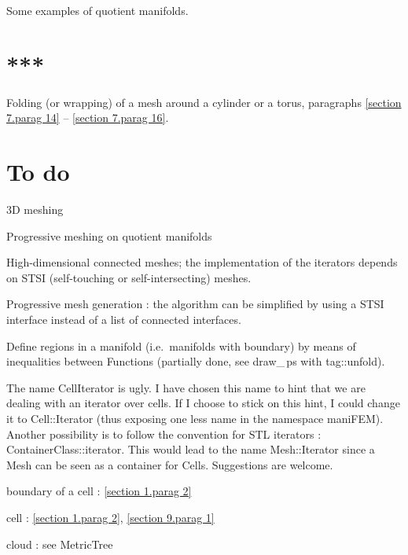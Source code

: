 \documentclass[a4paper]{scrreprt}
\def\numb{}
\newcommand\verm[1]{\textcolor{manif}{#1}}
\renewcommand\tt{\normalfont\ttfamily}
\begin{document}
\noindent Some examples of quotient manifolds.


\section*{***}

\noindent Folding (or wrapping) of a mesh around a cylinder or a torus, paragraphs
\ref{\numb section 7.\numb parag 14} -- \ref{\numb section 7.\numb parag 16}.


\section*{To do}

\noindent 3D meshing

\noindent Progressive meshing on quotient manifolds

\noindent High-dimensional connected meshes; the implementation of the iterators depends
on STSI (self-touching or self-intersecting) meshes.

\noindent Progressive mesh generation : the algorithm can be simplified by using
a STSI interface instead of a list of connected interfaces.

\noindent Define regions in a manifold (i.e.\ manifolds with boundary) by means of
inequalities between {\small\tt\verm{Function}}s (partially done, see {\small\tt draw\_\,ps}
with {\small\tt\verm{tag}::unfold}).

\noindent The name {\small\tt\verm{CellIterator}} is ugly.
I have chosen this name to hint that we are dealing with an iterator over cells.
If I choose to stick on this hint, I could change it to {\small\tt\verm{Cell}::Iterator}
(thus exposing one less name in the {\small\tt namespace \verm{maniFEM}}).
Another possibility is to follow the convention for {\tt STL} iterators :
{\small\tt ContainerClass::iterator}.
This would lead to the name {\small\tt\verm{Mesh}::Iterator} since a {\small\tt\verm{Mesh}}
can be seen as a container for {\small\tt\verm{Cell}}s.
Suggestions are welcome.




\noindent
boundary of a cell : \ref{\numb section 1.\numb parag 2}

\noindent
cell : \ref{\numb section 1.\numb parag 2}, \ref{\numb section 9.\numb parag 1}

\noindent
cloud : see {\small\tt \verm{MetricTree}}
\end{document}
